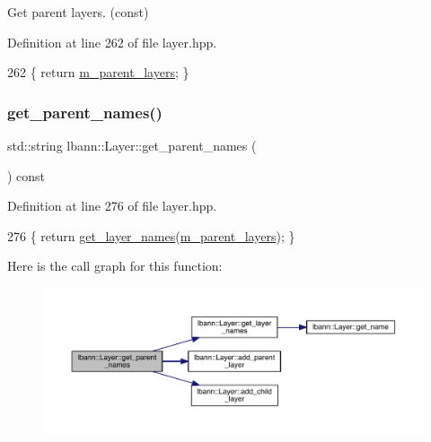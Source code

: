 Get parent layers. (const) 

Definition at line 262 of file layer.\+hpp.


\begin{DoxyCode}
262 \{ \textcolor{keywordflow}{return} \hyperlink{classlbann_1_1Layer_a3fa7c6cf1a22bb14ab0e85e3dc6027c5}{m\_parent\_layers}; \}
\end{DoxyCode}
\mbox{\label{classlbann_1_1Layer_afdf36947beec676a71ecd6167c3bb724}} 
\subsubsection{\texorpdfstring{get\+\_\+parent\+\_\+names()}{get\_parent\_names()}}
{\footnotesize\ttfamily std\+::string lbann\+::\+Layer\+::get\+\_\+parent\+\_\+names (\begin{DoxyParamCaption}{ }\end{DoxyParamCaption}) const\hspace{0.3cm}{\ttfamily [inline]}}



Definition at line 276 of file layer.\+hpp.


\begin{DoxyCode}
276 \{ \textcolor{keywordflow}{return} \hyperlink{classlbann_1_1Layer_af4a093d91552cf079217eb346bbb847f}{get\_layer\_names}(\hyperlink{classlbann_1_1Layer_a3fa7c6cf1a22bb14ab0e85e3dc6027c5}{m\_parent\_layers}); \}
\end{DoxyCode}
Here is the call graph for this function\+:\nopagebreak
\begin{figure}[H]
\begin{center}
\leavevmode
\includegraphics[width=350pt]{classlbann_1_1Layer_afdf36947beec676a71ecd6167c3bb724_cgraph}
\end{center}
\end{figure}
\mbox{\label{classlbann_1_1Layer_a45853df73a2e72bfaa774665a0f37ed7}} 
